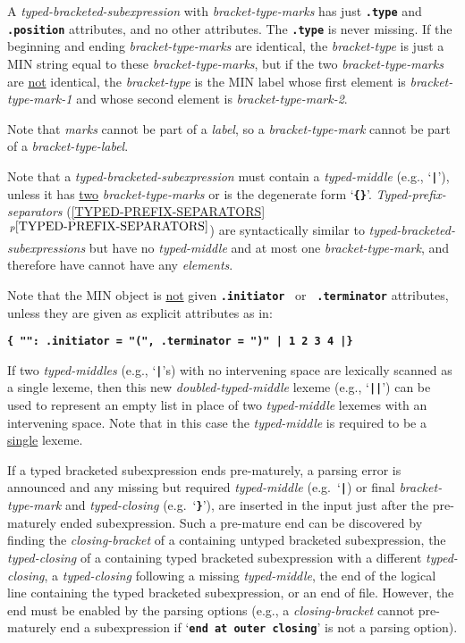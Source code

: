\documentclass[12pt]{article}
\newcommand{\TT}[1]{{\tt \bfseries #1}}
\newcommand{\itemref}[1]{\ref{#1}$\,^{p\pageref{#1}}$}
\begin{document}
A {\em typed-bracketed-subexpression} with {\em bracket-type-marks}
has just \TT{.type} and \TT{.position}
attributes, and no other attributes.  The \TT{.type}
is never missing.  If the beginning and ending
{\em bracket-type-marks} are identical, the {\em bracket-type}
is just a MIN string equal to these {\em bracket-type-marks},
but if the two {\em bracket-type-marks} are \underline{not} identical,
the {\em bracket-type} is the MIN label whose first element is
{\em bracket-type-mark-1} and whose second element is
{\em bracket-type-mark-2}.

Note that {\em marks} cannot be part of a {\em label}, so a
{\em bracket-type-mark} cannot be part of a {\em bracket-type-label}.

Note that a {\em typed-bracketed-subexpression} must contain a
{\em typed-middle} (e.g., `\TT{|}'), unless it has
\underline{two} {\em bracket-type-marks} or is the degenerate
form `\TT{\{\}}'.
{\em Typed-prefix-separators} (\itemref{TYPED-PREFIX-SEPARATORS})
are syntactically similar to {\em typed-bracketed-subexpressions}
but have no {\em typed-middle} and at most one {\em bracket-type-mark},
and therefore have cannot have any {\em elements}.

Note that the MIN object is \underline{not} given \TT{.initiator}
~or~ \TT{.terminator} attributes, unless they are given as explicit
attributes as in:
\begin{center}
\TT{\{ "":~.initiator = "(", .terminator = ")" | 1 2 3 4 |\}}
\end{center}

If two {\em typed-middles} (e.g., `\TT{|}'s) with no intervening space
are lexically scanned as a single lexeme, then this new
{\em doubled-typed-middle} lexeme (e.g., `\TT{||}') can be used
to represent an empty list in place of
two {\em typed-middle} lexemes with an intervening space.
Note that in this case the {\em typed-middle} is required to be
a \underline{single} lexeme.

If a typed bracketed subexpression ends pre-maturely,
a parsing error is announced and any missing but required
{\em typed-middle} (e.g.~`\TT{|})
or final {\em bracket-type-mark}
and {\em typed-closing} (e.g.~`\TT{\}}'),
are inserted in the input
just after the pre-maturely ended subexpression.  Such a pre-mature end can be
discovered by finding the {\em closing-bracket} of a containing
untyped bracketed subexpression, the {\em typed-closing}
of a containing typed bracketed subexpression with a different
{\em typed-closing}, a {\em typed-closing} following a missing
{\em typed-middle}, the end of the logical line
containing the typed bracketed subexpression,
or an end of file.  However, the end must be enabled by the
parsing options (e.g., a {\em closing-bracket} cannot pre-maturely
end a subexpression if `\TT{end at outer closing}' is not a parsing
option).
\end{document}
